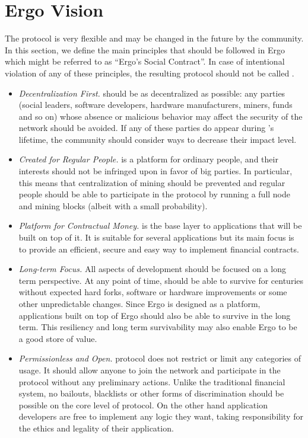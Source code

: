 \section{Ergo Vision}
\label{sec:social}


The \Ergo{} protocol is very flexible and may be changed in the future by the community.
In this section, we define the main principles that should be followed in Ergo which
might be referred to as ``Ergo's Social Contract''.
In case of intentional violation of any of these principles, the resulting protocol should not
be called \Ergo{}.


\begin{itemize}
    \item{\em Decentralization First.} \Ergo{} should be as decentralized as possible: any parties (social leaders, software developers, hardware manufacturers, miners, funds and so on)
    whose absence or malicious behavior may affect the security of the network should be avoided.
    If any of these parties do appear during \Ergo{}'s lifetime, the community should consider ways to decrease their impact level.
    \item{\em Created for Regular People.} \Ergo{} is a platform for ordinary people, and their interests should not be infringed upon in favor of big parties.
    In particular, this means that centralization of mining should be prevented and regular people should be able to participate in the protocol by running a full node and mining blocks (albeit with a small probability).
    \item{\em Platform for Contractual Money.} \Ergo{} is the base layer to applications that will be built on top of it.
    It is suitable for several applications but its main focus is to provide an efficient, secure and easy way to implement financial contracts.
    \item{\em Long-term Focus.} All aspects of \Ergo{} development should be focused on a long term perspective.
    At any point of time, \Ergo{} should be able to survive for centuries without expected hard forks,
    software or hardware improvements or some other unpredictable changes.
    Since Ergo is designed as a platform, applications built on top of Ergo should also be able to survive in the long term.
    This resiliency and long term survivability may also enable Ergo to be a good store of value.
    \item{\em Permissionless and Open.} \Ergo{} protocol does not restrict or limit any categories of usage.
    It should allow anyone to join the network and participate in the protocol without any preliminary actions.
    Unlike the traditional financial system, no bailouts, blacklists or other forms of discrimination should be possible
    on the core level of \Ergo{} protocol.
    On the other hand application developers are free to implement any logic they want, taking responsibility for the ethics and legality of their application.
\end{itemize}
